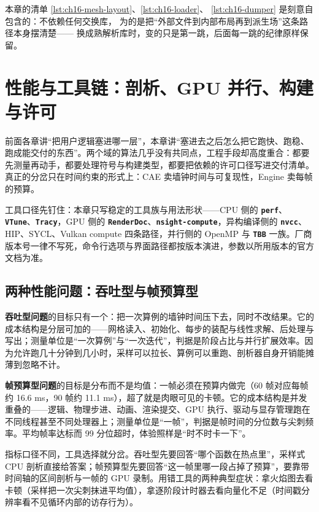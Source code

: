 \documentclass[12pt,a4paper,fontset=fandol]{ctexbook}
\newcommand{\Lib}[1]{\textbf{\texttt{#1}}}
\newcommand{\Lang}[1]{\textsf{#1}}
\newcommand{\DomCAE}{\Lang{CAE}}
\newcommand{\DomEngine}{\Lang{Engine}}
\begin{document}
本章的清单 \ref{lst:ch16-mesh-layout}、\ref{lst:ch16-loader}、
\ref{lst:ch16-dumper} 是刻意自包含的：不依赖任何交换库，
为的是把``外部文件到内部布局再到派生场''这条路径本身摆清楚——
换成熟解析库时，变的只是第一跳，后面每一跳的纪律原样保留。

\chapter{性能与工具链：剖析、GPU 并行、构建与许可}
\label{ch:ch17-perf-toolchain}

前面各章讲``把用户逻辑塞进哪一层''，本章讲``塞进去之后怎么把它跑快、跑稳、跑成能交付的东西''。两个域的算法几乎没有共同点，工程手段却高度重合：都要先测量再动手，都要处理符号与构建类型，都要把依赖的许可口径写进交付清单。真正的分岔只在时间约束的形式上：\DomCAE{} 卖墙钟时间与可复现性，\DomEngine{} 卖每帧的预算。

工具口径先钉住：本章只写稳定的工具族与用法形状——CPU 侧的 \Lib{perf}、\Lib{VTune}、\Lib{Tracy}，GPU 侧的 \Lib{RenderDoc}、\Lib{nsight-compute}，异构编译侧的 \Lib{nvcc}、\Lang{HIP}、\Lang{SYCL}、\Lang{Vulkan compute} 四条路径，并行侧的 \Lang{OpenMP} 与 \Lib{TBB} 一族。厂商版本号一律不写死，命令行选项与界面路径都按版本演进，参数以所用版本的官方文档为准。

\section{两种性能问题：吞吐型与帧预算型}
\label{sec:ch17-two-metrics}

\textbf{吞吐型问题}的目标只有一个：把一次算例的墙钟时间压下去，同时不改结果。它的成本结构是分层可加的——网格读入、初始化、每步的装配与线性求解、后处理与写出；测量单位是``一次算例''与``一次迭代''，判据是阶段占比与并行扩展效率。因为允许跑几十分钟到几小时，采样可以拉长、算例可以重跑、剖析器自身开销能摊薄到忽略不计。

\textbf{帧预算型问题}的目标是分布而不是均值：一帧必须在预算内做完（60 帧对应每帧约 16.6 ms，90 帧约 11.1 ms），超了就是肉眼可见的卡顿。它的成本结构是并发重叠的——逻辑、物理步进、动画、渲染提交、GPU 执行、驱动与显存管理跑在不同线程甚至不同处理器上；测量单位是``一帧''，判据是帧时间的分位数与尖刺频率。平均帧率达标而 99 分位超时，体验照样是``时不时卡一下''。

指标口径不同，工具选择就分岔。吞吐型先要回答``哪个函数在热点里''，采样式 CPU 剖析直接给答案；帧预算型先要回答``这一帧里哪一段占掉了预算''，要靠带时间轴的区间剖析与一帧的 GPU 录制。用错工具的两种典型症状：拿火焰图去看卡顿（采样把一次尖刺抹进平均值），拿逐阶段计时器去看向量化不足（时间戳分辨率看不见循环内部的访存行为）。
\end{document}
